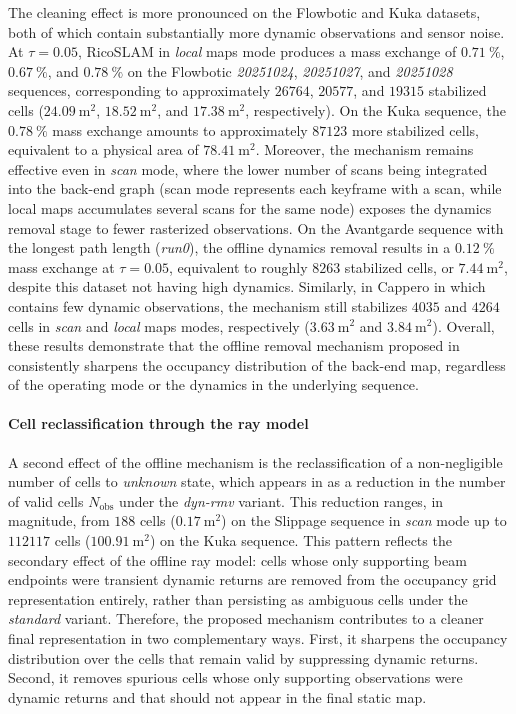 The cleaning effect is more pronounced on the Flowbotic and
Kuka datasets, both of which contain substantially more dynamic
observations and sensor noise. At $\tau = 0.05$, RicoSLAM in \emph{local}
maps mode produces a mass exchange of $\SI{0.71}{\percent}$,
$\SI{0.67}{\percent}$, and $\SI{0.78}{\percent}$ on the Flowbotic
\emph{20251024}, \emph{20251027}, and \emph{20251028} sequences,
corresponding to approximately $\num{26764}$, $\num{20577}$, and
$\num{19315}$ stabilized cells
($\SI{24.09}{\metre\squared}$, $\SI{18.52}{\metre\squared}$, and
$\SI{17.38}{\metre\squared}$, respectively). On the Kuka sequence,
the $\SI{0.78}{\percent}$ mass exchange amounts to approximately
$\num{87123}$ more stabilized cells, equivalent to a physical area of
$\SI{78.41}{\metre\squared}$.
Moreover, the mechanism remains effective even in \emph{scan} mode, where
the lower number of scans being integrated into the back-end graph
(scan mode represents each keyframe with a scan, while local maps accumulates
several scans for the same node) exposes the dynamics removal stage to fewer
rasterized observations. On the Avantgarde sequence with the longest path length
(\emph{run0}), the offline dynamics removal results in a $\SI{0.12}{\percent}$
mass exchange at $\tau = 0.05$, equivalent to roughly $\num{8263}$ stabilized
cells, or $\SI{7.44}{\metre\squared}$, despite this dataset not having
high dynamics. Similarly, in Cappero in which contains few dynamic observations,
the mechanism still stabilizes $\num{4035}$ and
$\num{4264}$ cells in \emph{scan} and \emph{local} maps modes,
respectively ($\SI{3.63}{\metre\squared}$ and $\SI{3.84}{\metre\squared}$).
Overall, these results demonstrate that the offline removal mechanism proposed
in  consistently sharpens the occupancy
distribution of the back-end map, regardless of the operating mode or
the dynamics in the underlying sequence.

\paragraph{Cell reclassification through the ray model}
A second effect of the offline mechanism is the reclassification of a
non-negligible number of cells to \emph{unknown} state, which appears in
 as a reduction in the number of
valid cells $N_{\mathrm{obs}}$ under the \emph{dyn-rmv} variant.
This reduction ranges, in magnitude, from $188$ cells
($\SI{0.17}{\metre\squared}$) on the Slippage sequence in \emph{scan}
mode up to $\num{112117}$ cells ($\SI{100.91}{\metre\squared}$) on
the Kuka sequence. This pattern reflects the secondary effect of the
offline ray model: cells whose only supporting beam endpoints were
transient dynamic returns are removed from the occupancy grid
representation entirely, rather than persisting as ambiguous cells under
the \emph{standard} variant.
Therefore, the proposed mechanism contributes to a cleaner final representation
in two complementary ways. First, it sharpens the occupancy distribution over
the cells that remain valid by suppressing dynamic returns. Second, it removes
spurious cells whose only supporting observations were dynamic returns and
that should not appear in the final static map.

